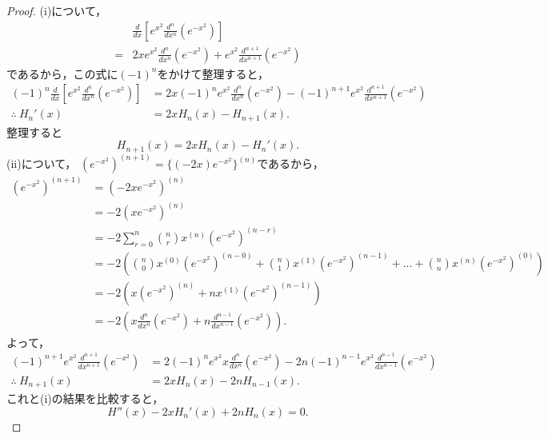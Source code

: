 \documentclass[a4paper,10pt,fleqn]{ltjsarticle}
\begin{document}
\begin{leftbar}
    \begin{proof}
        (i)について，
        \begin{align*}
              & \frac{d}{dx} \left[ e^{x^2} \frac{d^n}{dx^n} (e^{-x^2} )\right]                      \\
            = & 2x e^{x^2} \frac{d^n}{dx^n} (e^{-x^2}) + e^{x^2} \frac{d^{n+1}}{dx^{n+1}} (e^{-x^2})
        \end{align*}
        であるから，この式に$(-1)^n$をかけて整理すると，
        \begin{align*}
            (-1)^n \frac{d}{dx} \left[ e^{x^2} \frac{d^n}{dx^n} (e^{-x^2} )\right] & = 2x(-1)^n e^{x^2} \frac{d^n}{dx^n} (e^{-x^2}) -(-1)^{n+1} e^{x^2} \frac{d^{n+1}}{dx^{n+1}} (e^{-x^2}) \\
            \therefore ~ H_n ' (x)                                                 & = 2x H_n(x) - H_{n+1}(x).
        \end{align*}
        整理すると
        \[
            H_{n+1}(x) =  2x H_n(x)-H_n'(x).
        \]
        (ii)について，
        $ (e^{-x^2})^{(n+1)} = \{ (-2x)e^{-x^2} \}^{(n)}$であるから，
        \begin{align*}
            (e^{-x^2})^{(n+1)} & = (-2xe^{-x^2})^{(n)}                                                                                                                                  \\
                               & = -2 (xe^{-x^2})^{(n)}                                                                                                                                 \\
                               & = -2 \sum_{r=0}^{n} \binom{n}{r} x^{(n)} (e^{-x^2})^{(n-r)}                                                                                            \\
                               & = -2 \left ( \binom{n}{0} x^{(0)} (e^{-x^2})^{(n-0)} + \binom{n}{1} x^{(1)} (e^{-x^2})^{(n-1)} + \dots + \binom{n}{n} x^{(n)} (e^{-x^2})^{(0)} \right) \\
                               & = -2 \left(  x (e^{-x^2})^{(n)} + n x^{(1)} (e^{-x^2})^{(n-1)} \right)                                                                                 \\
                               & = -2 \left ( x \frac{d^n}{dx^n} (e^{-x^2}) + n \frac{d^{n-1}}{dx^{n-1}} (e^{-x^2}) \right).
        \end{align*}
        よって，
        \begin{align*}
            (-1)^{n+1} e^{x^2} \frac{d^{n+1}}{d x^{n+1}} (e^{-x^2}) & = 2 (-1)^n e^{x^2} x \frac{d^n}{dx^n} (e^{-x^2}) -2 n (-1)^{n-1} e^{x^2}\frac{d^{n-1}}{dx^{n-1}} (e^{-x^2}) \\
            \therefore ~ H_{n+1} (x)                                & = 2x H_n(x) - 2nH_{n-1}(x).
        \end{align*}
        これと(i)の結果を比較すると，
        \[
            H '' (x) - 2x H_n' (x) + 2nH_n (x)=0.
        \]
    \end{proof}
\end{leftbar}
\end{document}
